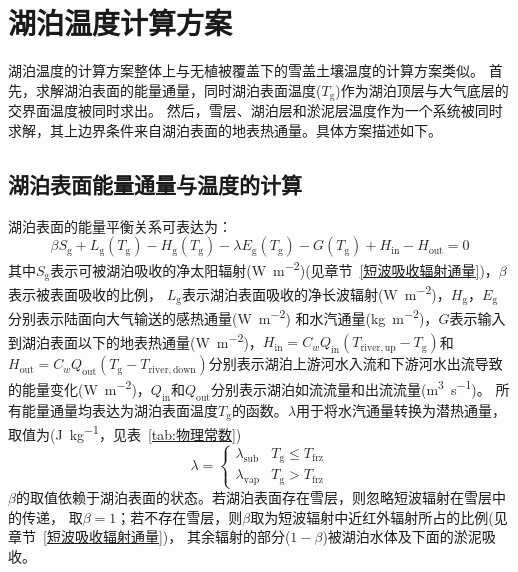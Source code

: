 \section{湖泊温度计算方案}
湖泊温度的计算方案整体上与无植被覆盖下的雪盖土壤温度的计算方案类似。
首先，求解湖泊表面的能量通量，同时湖泊表面温度($T_{\mathrm {g}} $)作为湖泊顶层与大气底层的交界面温度被同时求出。
然后，雪层、湖泊层和淤泥层温度作为一个系统被同时求解，其上边界条件来自湖泊表面的地表热通量。具体方案描述如下。

\subsection{湖泊表面能量通量与温度的计算}\label{湖泊表面能量通量与温度的计算}
湖泊表面的能量平衡关系可表达为：
\begin{equation}
  \beta S_{\mathrm{g}}+L_{\mathrm{g}}\left(T_{\mathrm{g}}\right)-H_{\mathrm{g}}\left(T_{\mathrm{g}}\right)-\lambda E_{\mathrm{g}}\left(T_{\mathrm{g}}\right)-G\left(T_{\mathrm{g}}\right)+H_{\mathrm{in}}-H_{\mathrm{out}}=0
\end{equation}
其中$S_{\mathrm {g}} $表示可被湖泊吸收的净太阳辐射(\unit{W.m^{-2}})(见章节~\ref{短波吸收辐射通量})，$\beta$表示被表面吸收的比例，
$L_{\mathrm {g}} $表示湖泊表面吸收的净长波辐射(\unit{W.m^{-2}})，$H_{\mathrm {g}} $，$E_{\mathrm {g}} $分别表示陆面向大气输送的感热通量(\unit{W.m^{-2}})
和水汽通量(\unit{kg.m^{-2}})，$G$表示输入到湖泊表面以下的地表热通量(\unit{W.m^{-2}})，$H_{\mathrm{in}}=C_wQ_{\mathrm{in}}(T_{\mathrm{river,up}}-T_{\mathrm {g}} )$和$H_{\mathrm{out}}=C_wQ_{\mathrm{out}}(T_{\mathrm {g}} -T_{\mathrm{river,down}})$分别表示湖泊上游河水入流和下游河水出流导致的能量变化(\unit{W.m^{-2}})，$Q_{\mathrm{in}}$和$Q_{\mathrm{out}}$分别表示湖泊如流流量和出流流量(\unit{m^{3}.s^{-1}})。
所有能量通量均表达为湖泊表面温度$T_{\mathrm {g}} $的函数。$\lambda$用于将水汽通量转换为潜热通量，取值为(\unit{J.kg^{-1}}，见表~\ref{tab:物理常数})
\begin{equation}
  \lambda=\left\{\begin{array}{ll}\lambda_{\mathrm{sub}} & T_{\mathrm{g}} \leqslant T_{\mathrm {frz}} \\ \lambda_{\mathrm{vap}} & T_{\mathrm{g}}>T_{\mathrm {frz}}\end{array}\right.
\end{equation}
$\beta$的取值依赖于湖泊表面的状态。若湖泊表面存在雪层，则忽略短波辐射在雪层中的传递，
取$\beta=1$；若不存在雪层，则$\beta$取为短波辐射中近红外辐射所占的比例(见章节~\ref{短波吸收辐射通量})，
其余辐射的部分($1-\beta$)被湖泊水体及下面的淤泥吸收。


